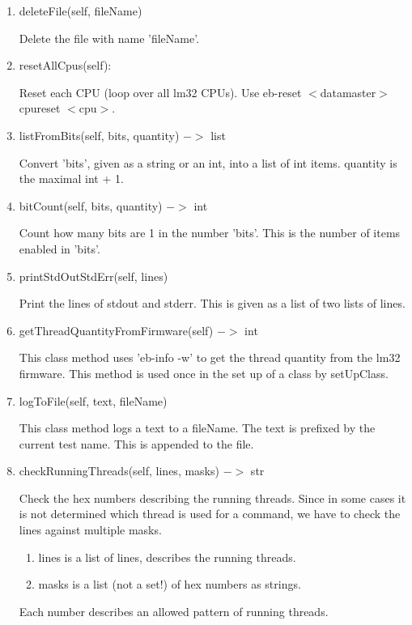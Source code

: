 \documentclass[12pt,a4paper]{report}
\begin{document}
\begin{enumerate}
\item deleteFile(self, fileName)

Delete the file with name 'fileName'.

\item resetAllCpus(self):

Reset each CPU (loop over all lm32 CPUs). Use eb-reset $<$datamaster$>$ cpureset $<$cpu$>$.

\item listFromBits(self, bits, quantity) $->$ list

Convert 'bits', given as a string or an int, into a list of
int items. quantity is the maximal int + 1.

\item bitCount(self, bits, quantity) $->$ int

Count how many bits are 1 in the number 'bits'.
This is the number of items enabled in 'bits'.

\item printStdOutStdErr(self, lines)

Print the lines of stdout and stderr. This is given as a list of
two lists of lines.

\item getThreadQuantityFromFirmware(self) $->$ int

This class method uses 'eb-info -w' to get the thread quantity
from the lm32 firmware. This method is used once in the set up of
a class by setUpClass.

\item logToFile(self, text, fileName)

This class method logs a text to a fileName. The text is prefixed
by the current test name. This is appended to the file.

\item checkRunningThreads(self, lines, masks) $->$ str

Check the hex numbers describing the running threads.
Since in some cases it is not determined which thread is used for a
command, we have to check the lines against multiple masks.
\begin{enumerate}
\item lines is a list of lines, describes the running threads.
\item masks is a list (not a set!) of hex numbers as strings.
\end{enumerate}
    Each number describes an allowed pattern of running threads.
\end{enumerate}
\end{document}
